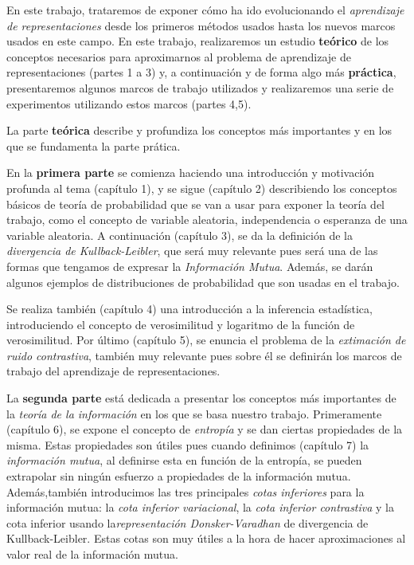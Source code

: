 En este trabajo, trataremos de exponer cómo ha ido evolucionando el \emph{aprendizaje de representaciones} desde los primeros métodos usados hasta los nuevos marcos usados en este campo. En este trabajo, realizaremos un estudio \textbf{teórico} de los conceptos necesarios para aproximarnos al problema de aprendizaje de representaciones (partes 1 a 3) y, a continuación y de forma algo más \textbf{práctica}, presentaremos algunos marcos de trabajo utilizados y realizaremos una serie de experimentos utilizando estos marcos (partes 4,5).

La parte \textbf{teórica} describe y profundiza los conceptos más importantes y en los que se fundamenta la parte prática.

En la \textbf{primera parte} se comienza haciendo una introducción y motivación profunda al tema (capítulo 1), y se sigue (capítulo 2) describiendo los conceptos básicos de teoría de probabilidad que se van a usar para exponer la teoría del trabajo, como el concepto de variable aleatoria, independencia o esperanza de una variable aleatoria. A continuación (capítulo 3), se da la definición de la \emph{divergencia de Kullback-Leibler}, que será muy relevante pues será una de las formas que tengamos de expresar la \emph{Información Mutua}. Además, se darán algunos ejemplos de distribuciones de probabilidad que son usadas en el trabajo. 

Se realiza también (capítulo 4) una introducción a la inferencia estadística, introduciendo el concepto de verosimilitud y logaritmo de la función de verosimilitud. Por último (capítulo 5), se enuncia el problema de la  \emph{extimación de ruido contrastiva}, también muy relevante pues sobre él se definirán los marcos de trabajo del aprendizaje de representaciones.


La \textbf{segunda parte} está dedicada a presentar los conceptos más importantes de la \emph{teoría de la información} en los que se basa nuestro trabajo. Primeramente (capítulo 6), se expone el concepto de  \emph{entropía} y se dan ciertas propiedades de la misma. Estas propiedades son útiles pues cuando definimos (capítulo 7) la \emph{información mutua}, al definirse esta en función de la entropía, se pueden extrapolar sin ningún esfuerzo a propiedades de la información mutua. Además,también introducimos las tres principales \emph{cotas inferiores} para la información mutua: la \emph{cota inferior variacional}, la \emph{cota inferior contrastiva} y la cota inferior usando la\emph{representación Donsker-Varadhan} de divergencia de Kullback-Leibler. Estas cotas son muy útiles a la hora de hacer aproximaciones al valor real de la información mutua.

